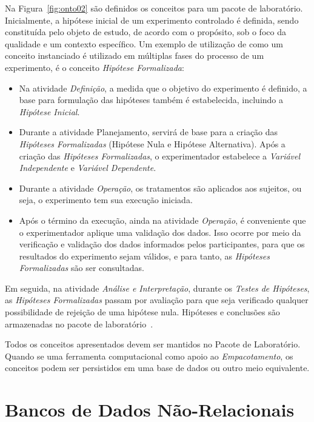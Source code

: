 Na Figura~\ref{fig:onto02} são definidos os conceitos para um pacote de laboratório. Inicialmente, a hipótese inicial de um experimento controlado é definida, sendo constituída pelo objeto de estudo, de acordo com o propósito, sob o foco da qualidade e um contexto específico. Um exemplo de utilização de como um conceito instanciado é utilizado em múltiplas  fases do processo de um experimento, é o conceito \textit{Hipótese Formalizada}:

\begin{itemize}
\item Na atividade \textit{Definição}, a medida que o objetivo do experimento é definido, a base para formulação das hipóteses também é estabelecida, incluindo a \textit{Hipótese Inicial}.
\item Durante a atividade Planejamento, servirá de base para a criação das \textit{Hipóteses Formalizadas} (Hipótese Nula e Hipótese Alternativa). Após a criação das \textit{Hipóteses Formalizadas}, o experimentador estabelece a \textit{Variável Independente} e \textit{Variável Dependente}.
\item Durante a atividade \textit{Operação}, os tratamentos são aplicados aos sujeitos, ou seja, o experimento tem sua execução iniciada.
\item Após o término da execução, ainda na atividade \textit{Operação}, é conveniente que o experimentador aplique uma validação dos dados. Isso ocorre por meio da verificação e validação dos dados informados pelos participantes, para que os resultados do experimento sejam válidos, e para tanto, as \textit{Hipóteses Formalizadas} são ser consultadas.
\end{itemize}


Em seguida, na atividade \textit{Análise e Interpretação}, durante os \textit{Testes de Hipóteses}, as \textit{Hipóteses Formalizadas} passam por avaliação para que seja verificado qualquer possibilidade de rejeição de uma hipótese nula. Hipóteses e conclusões são armazenadas no pacote de laboratório~\cite{Pucci2014}. 

Todos os conceitos apresentados devem ser mantidos no Pacote de Laboratório. Quando se uma ferramenta computacional como apoio ao \textit{Empacotamento}, os conceitos podem ser persistidos em uma base de dados ou outro meio equivalente.


\section{Bancos de Dados Não-Relacionais}

